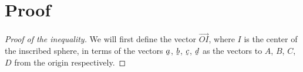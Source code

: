 \documentclass[12pt]{article}
\newcommand{\ut}[1]{\underaccent{\tilde}{#1}}
\renewcommand{\vec}[1]{\ut{#1}}
\begin{document}
\section{Proof}
\begin{proof}[Proof of the inequality]
  We will first define the vector $\overrightarrow{OI}$, where $I$ is the center of the inscribed sphere, in terms of the vectors $\vec{a}$, $\vec{b}$, $\vec{c}$, $\vec{d}$ as the vectors to $A$, $B$, $C$, $D$ from the origin respectively.
\end{proof}
\end{document}
